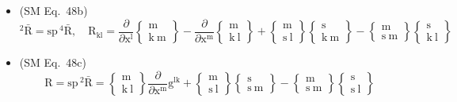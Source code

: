 \documentclass[12pt]{article}
\begin{document}
\begin{itemize}[label={},leftmargin=0pt]
    \item (SM Eq.\ 48b) 
    \[
    {}^2\bar{\mathrm{R}} = \mathrm{sp} \, {}^4\bar{\mathrm{R}}, \quad \mathrm{R}_{\mathrm{kl}} = \frac{\partial}{\partial \mathrm{x^l}}\left\{ \begin{smallmatrix} \mathrm{m} \\ \mathrm{k\ m} \end{smallmatrix} \right\} - \frac{\partial}{\partial \mathrm{x^m}}\left\{ \begin{smallmatrix} \mathrm{m} \\ \mathrm{k\ l} \end{smallmatrix} \right\} + \left\{ \begin{smallmatrix} \mathrm{m} \\ \mathrm{s\ l} \end{smallmatrix} \right\}\left\{ \begin{smallmatrix} \mathrm{s} \\ \mathrm{k\ m} \end{smallmatrix} \right\} - \left\{ \begin{smallmatrix} \mathrm{m} \\ \mathrm{s\ m} \end{smallmatrix} \right\}\left\{ \begin{smallmatrix} \mathrm{s} \\ \mathrm{k\ l} \end{smallmatrix} \right\}
    \]

    \item (SM Eq.\ 48c) 
    \[
    \mathrm{R} = \mathrm{sp} \, {}^2\bar{\mathrm{R}} = \left\{ \begin{smallmatrix} \mathrm{m} \\ \mathrm{k\ l} \end{smallmatrix} \right\}\frac{\partial}{\partial \mathrm{x^m}} \mathrm{g}^{\mathrm{lk}} + \left\{ \begin{smallmatrix} \mathrm{m} \\ \mathrm{s\ l} \end{smallmatrix} \right\}\left\{ \begin{smallmatrix} \mathrm{s} \\ \mathrm{s\ m} \end{smallmatrix} \right\} - \left\{ \begin{smallmatrix} \mathrm{m} \\ \mathrm{s\ m} \end{smallmatrix} \right\}\left\{ \begin{smallmatrix} \mathrm{s} \\ \mathrm{s\ l} \end{smallmatrix} \right\}
    \]


\end{itemize}
\end{document}
